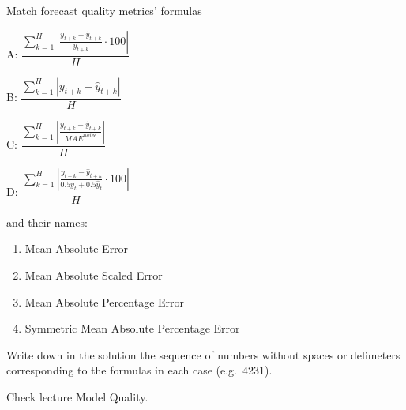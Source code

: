 
\begin{question}
Match forecast quality metrics' formulas

A: \(\dfrac{\sum_{k=1}^H \left| {\frac{y_{t+k} - \hat y_{t+k}}{y_{t+k}} \cdot 100} \right| }{H}\)

B: \(\dfrac{\sum_{k=1}^H \left| {y_{t+k} - \hat y_{t+k}} \right| }{H}\)

C: \(\dfrac{\sum_{k=1}^H \left|\frac{y_{t+k} - \hat y_{t+k}}{MAE^{naive}}\right| }{H}\)

D: \(\dfrac{\sum_{k=1}^H \left| {\frac{y_{t+k} - \hat y_{t+k}}{0.5 y_t + 0.5\hat y_t} \cdot 100} \right| }{H}\)

and their names:

\begin{enumerate}
\def\labelenumi{\arabic{enumi}.}
\item
  Mean Absolute Error
\item
  Mean Absolute Scaled Error
\item
  Mean Absolute Percentage Error
\item
  Symmetric Mean Absolute Percentage Error
\end{enumerate}

Write down in the solution the sequence of numbers without spaces or delimeters corresponding to the formulas in each case (e.g.~4231).
\end{question}

\begin{solution}
Check lecture Model Quality.
\end{solution}

